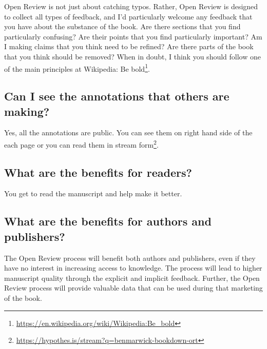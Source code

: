 \documentclass[12pt,]{krantz}
\renewcommand{\href}[2]{#2\footnote{\url{#1}}}
\theoremstyle{definition}
\theoremstyle{definition}
\theoremstyle{definition}
\theoremstyle{remark}
\begin{document}
Open Review is not just about catching typos. Rather, Open Review is
designed to collect all types of feedback, and I'd particularly welcome
any feedback that you have about the substance of the book. Are there
sections that you find particularly confusing? Are their points that you
find particularly important? Am I making claims that you think need to
be refined? Are there parts of the book that you think should be
removed? When in doubt, I think you should follow one of the main
principles at Wikipedia:
\href{https://en.wikipedia.org/wiki/Wikipedia:Be_bold}{Be bold}.

\hypertarget{can-i-see-the-annotations-that-others-are-making}{%
\subsection*{Can I see the annotations that others are
making?}\label{can-i-see-the-annotations-that-others-are-making}}

Yes, all the annotations are public. You can see them on right hand side
of the each page or you can read them in
\href{https://hypothes.is/stream?q=benmarwick-bookdown-ort}{stream
form}.

\hypertarget{what-are-the-benefits-for-readers}{%
\subsection*{What are the benefits for
readers?}\label{what-are-the-benefits-for-readers}}


You get to read the manuscript and help make it better.

\hypertarget{what-are-the-benefits-for-authors-and-publishers}{%
\subsection*{What are the benefits for authors and
publishers?}\label{what-are-the-benefits-for-authors-and-publishers}}

The Open Review process will benefit both authors and publishers, even
if they have no interest in increasing access to knowledge. The process
will lead to higher manuscript quality through the explicit and implicit
feedback. Further, the Open Review process will provide valuable data
that can be used during that marketing of the book.
\end{document}
